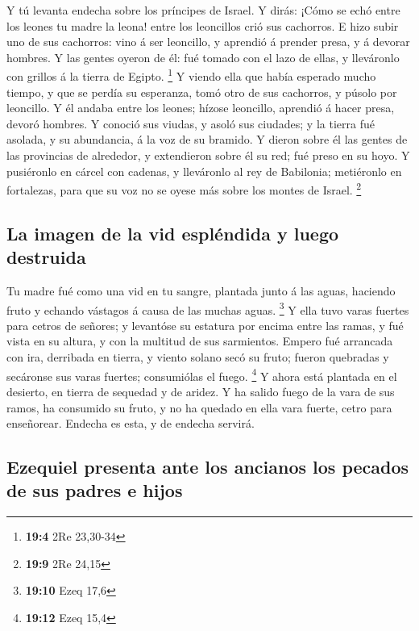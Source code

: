  Y tú levanta endecha sobre los príncipes de Israel.
 Y dirás: ¡Cómo se echó entre los leones tu madre la
leona! entre los leoncillos crió sus cachorros.  E hizo
subir uno de sus cachorros: vino á ser leoncillo, y aprendió á prender
presa, y á devorar hombres.  Y las gentes oyeron de él:
fué tomado con el lazo de ellas, y lleváronlo con grillos á la tierra de
Egipto. \footnote{\textbf{19:4} 2Re 23,30-34}  Y viendo
ella que había esperado mucho tiempo, y que se perdía su esperanza, tomó
otro de sus cachorros, y púsolo por leoncillo.  Y él
andaba entre los leones; hízose leoncillo, aprendió á hacer presa,
devoró hombres.  Y conoció sus viudas, y asoló sus
ciudades; y la tierra fué asolada, y su abundancia, á la voz de su
bramido.  Y dieron sobre él las gentes de las provincias
de alrededor, y extendieron sobre él su red; fué preso en su hoyo.
 Y pusiéronlo en cárcel con cadenas, y lleváronlo al rey
de Babilonia; metiéronlo en fortalezas, para que su voz no se oyese más
sobre los montes de Israel. \footnote{\textbf{19:9} 2Re 24,15}

\hypertarget{la-imagen-de-la-vid-espluxe9ndida-y-luego-destruida}{%
\subsection{La imagen de la vid espléndida y luego
destruida}\label{la-imagen-de-la-vid-espluxe9ndida-y-luego-destruida}}

 Tu madre fué como una vid en tu sangre, plantada junto á
las aguas, haciendo fruto y echando vástagos á causa de las muchas
aguas. \footnote{\textbf{19:10} Ezeq 17,6}  Y ella tuvo
varas fuertes para cetros de señores; y levantóse su estatura por encima
entre las ramas, y fué vista en su altura, y con la multitud de sus
sarmientos.  Empero fué arrancada con ira, derribada en
tierra, y viento solano secó su fruto; fueron quebradas y secáronse sus
varas fuertes; consumiólas el fuego. \footnote{\textbf{19:12} Ezeq 15,4}
 Y ahora está plantada en el desierto, en tierra de
sequedad y de aridez.  Y ha salido fuego de la vara de
sus ramos, ha consumido su fruto, y no ha quedado en ella vara fuerte,
cetro para enseñorear. Endecha es esta, y de endecha servirá.

\hypertarget{ezequiel-presenta-ante-los-ancianos-los-pecados-de-sus-padres-e-hijos}{%
\subsection{Ezequiel presenta ante los ancianos los pecados de sus
padres e
hijos}\label{ezequiel-presenta-ante-los-ancianos-los-pecados-de-sus-padres-e-hijos}}

